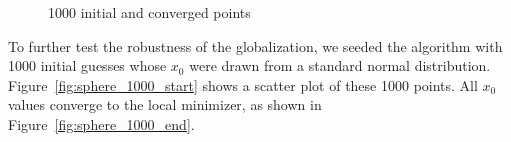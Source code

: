  \begin{figure}[H]
  \centering
  \hspace{1em}
   \caption{1000 initial and converged points \label{fig:sphere_1000}}  
\end{figure}

To further test the robustness of the globalization, we seeded the algorithm with 1000 initial guesses whose $x_0$ were drawn from a standard normal distribution. Figure~\ref{fig:sphere_1000_start} shows a scatter plot of these 1000 points.  All $x_0$ values converge to the local minimizer, as shown in Figure~\ref{fig:sphere_1000_end}.  

